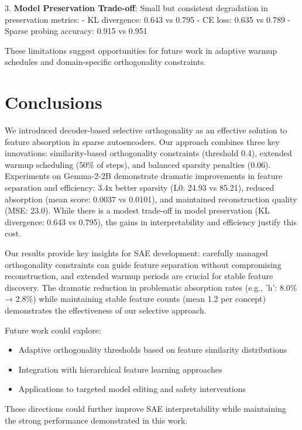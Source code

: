 \documentclass{article} %
\begin{document}
3. \textbf{Model Preservation Trade-off}: Small but consistent degradation in preservation metrics:
   - KL divergence: 0.643 vs 0.795
   - CE loss: 0.635 vs 0.789
   - Sparse probing accuracy: 0.915 vs 0.951

These limitations suggest opportunities for future work in adaptive warmup schedules and domain-specific orthogonality constraints.

\section{Conclusions}
\label{sec:conclusion}

We introduced decoder-based selective orthogonality as an effective solution to feature absorption in sparse autoencoders. Our approach combines three key innovations: similarity-based orthogonality constraints (threshold 0.4), extended warmup scheduling (50\% of steps), and balanced sparsity penalties (0.06). Experiments on Gemma-2-2B demonstrate dramatic improvements in feature separation and efficiency: 3.4x better sparsity (L0: 24.93 vs 85.21), reduced absorption (mean score: 0.0037 vs 0.0101), and maintained reconstruction quality (MSE: 23.0). While there is a modest trade-off in model preservation (KL divergence: 0.643 vs 0.795), the gains in interpretability and efficiency justify this cost.

Our results provide key insights for SAE development: carefully managed orthogonality constraints can guide feature separation without compromising reconstruction, and extended warmup periods are crucial for stable feature discovery. The dramatic reduction in problematic absorption rates (e.g., 'h': 8.0\% → 2.8\%) while maintaining stable feature counts (mean 1.2 per concept) demonstrates the effectiveness of our selective approach.

Future work could explore:
\begin{itemize}
\item Adaptive orthogonality thresholds based on feature similarity distributions
\item Integration with hierarchical feature learning approaches \cite{gurneeFindingNeuronsHaystack2023}
\item Applications to targeted model editing and safety interventions \cite{farrellApplyingSparseAutoencoders2024}
\end{itemize}

These directions could further improve SAE interpretability while maintaining the strong performance demonstrated in this work.



\end{document}
